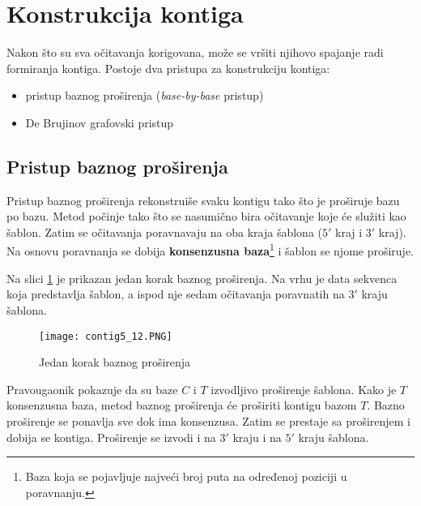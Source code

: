\documentclass[12pt,oneside]{memoir}
\begin{document}
\section{Konstrukcija kontiga}
\label{poglavlje:KonstrukcijaKontiga}

Nakon što su sva očitavanja korigovana, može se vršiti njihovo spajanje radi formiranja kontiga. Postoje dva pristupa za konstrukciju kontiga:
\begin{itemize}
\itemsep0em 
    \item{pristup baznog proširenja (\textit{base-by-base} pristup)}
    \item{De Brujinov grafovski pristup}
\end{itemize}

\subsection{Pristup baznog proširenja}

Pristup baznog proširenja rekonstruiše svaku kontigu tako što je proširuje bazu po bazu. Metod počinje tako što se nasumično bira očitavanje koje će služiti kao šablon. Zatim se očitavanja poravnavaju na oba kraja šablona ($5'$ kraj i $3'$ kraj). Na osnovu poravnanja se dobija \textbf{konsenzusna baza}\footnote{Baza koja se pojavljuje najveći broj puta na određenoj poziciji u poravnanju.} i šablon se njome proširuje.

Na slici \ref{fig:7} je prikazan jedan korak baznog proširenja.
Na vrhu je data sekvenca koja predstavlja šablon, a ispod nje sedam očitavanja poravnatih na $3'$ kraju šablona.

\begin{figure}[!ht]
  \centering
  \texttt{[image: contig5\_12.PNG]}
\caption{Jedan korak baznog proširenja \cite{WingKinSung}}
\label{fig:7}
\end{figure}

\noindent Pravougaonik pokazuje da su baze $C$ i $T$ izvodljivo proširenje šablona. Kako je $T$ konsenzusna baza, metod baznog proširenja će proširiti kontigu bazom $T$. Bazno proširenje se ponavlja sve dok ima konsenzusa. Zatim se prestaje sa proširenjem i dobija se kontiga. Proširenje se izvodi i na $3'$ kraju i na $5'$ kraju šablona.

\begin{comment}
Slika \ref{fig:8} daje pseudokod ovog metoda.

\begin{figure}[!ht]
\centering
\texttt{[image: SimpleAsembler5\_13.PNG]}
\caption{Jednostavan base-by-base asembler proširenja \cite{WingKinSung}} 
\label{fig:8}
\end{figure}

\end{comment}
\end{document}
